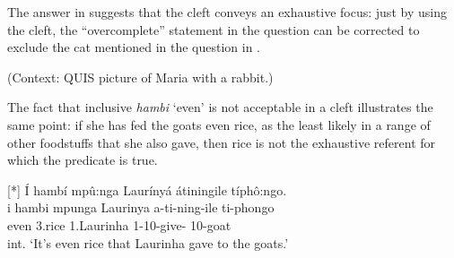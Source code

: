 \documentclass[output=paper]{langscibook}
\begin{document}
The answer in  suggests that the cleft conveys an exhaustive focus: just by using the cleft, the “overcomplete” statement in the question can be corrected to exclude the cat mentioned in the question in .\largerpage[-1]\pagebreak 

\ea\label{bkm:Ref127262426}(Context: QUIS picture of Maria with a rabbit.)
\begin{xlist}



\end{xlist}
\z

The fact that inclusive \textit{hambi} ‘even’ is not acceptable in a cleft  illustrates the same point: if she has fed the goats even rice, as the least likely in a range of other foodstuffs that she also gave, then rice is not the exhaustive referent for which the predicate is true.

\ea
[*]{
\label{bkm:Ref120694799}
Í hambí mpû:nga Laurínyá átiningile típhô:ngo.\\
\gll
i  hambi  mpunga  Laurinya  a-ti-ning-ile  ti-phongo\\
\COP{}  even  3.rice  1.Laurinha  1\SM{}-10\OM{}-give-\PFV{}  10-goat\\
\glt
int. ‘It’s even rice that Laurinha gave to the goats.’\\
}
\end{document}
